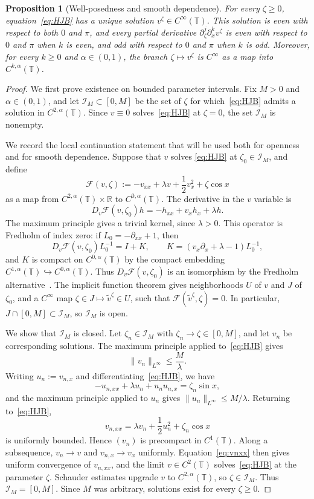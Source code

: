 \documentclass{amsart}
\newtheorem{proposition}[theorem]{Proposition}
\newcommand{\T}{\mathbb T}
\begin{document}
\begin{proposition}[Well-posedness and smooth dependence]\label{prop:smooth-zeta}
For every $\zeta\geq 0$, equation~\eqref{eq:HJB} has a unique solution
$v^\zeta\in C^\infty(\T)$. This solution is even with respect to both
$0$ and $\pi$, and every partial derivative $\partial_\zeta^j\partial_x^k v^\zeta$ is
even with respect to $0$ and $\pi$ when $k$ is even, and odd with respect to $0$ and $\pi$ when $k$
is odd. Moreover, for every $k\geq 0$ and $\alpha\in(0,1)$, the branch
$\zeta\mapsto v^\zeta$ is $C^\infty$ as a map into
$C^{k,\alpha}(\T)$.
\end{proposition}
\begin{proof}
We first prove existence on bounded parameter intervals. Fix
$M>0$ and $\alpha\in(0,1)$, and let $\mathcal I_M\subset[0,M]$ be the set
of $\zeta$ for which~\eqref{eq:HJB} admits a solution in
$C^{2,\alpha}(\T)$. Since $v\equiv0$ solves~\eqref{eq:HJB} at
$\zeta=0$, the set $\mathcal I_M$ is nonempty.

We record the local continuation statement that will be used both for
openness and for smooth dependence. Suppose that $v$ solves
\eqref{eq:HJB} at $\zeta_0\in\mathcal I_M$, and define
\[
\mathcal F(v,\zeta):=-v_{xx}+\lambda v+\frac12 v_x^2+\zeta\cos x
\]
as a map from
$C^{2,\alpha}(\T)\times\mathbb R$ to
$C^{0,\alpha}(\T)$. The derivative in the $v$ variable is
\[
D_v\mathcal F(v,\zeta_0)h=-h_{xx}+v_xh_x+\lambda h.
\]
The maximum principle gives a trivial kernel, since $\lambda>0$. This
operator is Fredholm of index zero: if $L_0=-\partial_{xx}+1$, then
\[
D_v\mathcal F(v,\zeta_0)L_0^{-1}=I+K,\qquad
K=(v_x\partial_x+\lambda-1)L_0^{-1},
\]
and $K$ is compact on $C^{0,\alpha}(\T)$ by the compact
embedding $C^{1,\alpha}(\T)\hookrightarrow
C^{0,\alpha}(\T)$. Thus $D_v\mathcal F(v,\zeta_0)$ is an
isomorphism by the Fredholm alternative~\cite[Thm.~5.3]{GT}. The
implicit function theorem gives neighborhoods $U$ of $v$ and $J$ of
$\zeta_0$, and a $C^\infty$ map
$\zeta\in J\mapsto \tilde v^\zeta\in U$, such that
$\mathcal F(\tilde v^\zeta,\zeta)=0$. In particular,
$J\cap[0,M]\subset\mathcal I_M$, so $\mathcal I_M$ is open.

We show that $\mathcal I_M$ is closed. Let
$\zeta_n\in\mathcal I_M$ with $\zeta_n\to\zeta\in[0,M]$, and let $v_n$
be corresponding solutions. The maximum principle applied to~\eqref{eq:HJB} gives
\[
\|v_n\|_{L^\infty}\leq \frac M\lambda .
\]
Writing $u_n:=v_{n,x}$ and differentiating~\eqref{eq:HJB}, we have
\[
-u_{n,xx}+\lambda u_n+u_nu_{n,x}=\zeta_n\sin x,
\]
and the maximum principle applied to $u_n$ gives
$\|u_n\|_{L^\infty}\leq M/\lambda$. Returning to~\eqref{eq:HJB},
\begin{equation}\label{eq:vnxx}
v_{n,xx}=\lambda v_n+\frac12 u_n^2+\zeta_n\cos x
\end{equation}
is uniformly bounded. Hence $(v_n)$ is precompact in $C^1(\T)$. Along
a subsequence, $v_n\to v$ and $v_{n,x}\to v_x$ uniformly. Equation~\eqref{eq:vnxx}
then gives uniform convergence of $v_{n,xx}$, and
the limit $v\in C^2(\T)$ solves~\eqref{eq:HJB} at the parameter
$\zeta$. Schauder estimates upgrade $v$ to $C^{2,\alpha}(\T)$,
so $\zeta\in\mathcal I_M$. Thus
$\mathcal I_M=[0,M]$. Since $M$ was arbitrary, solutions exist for every
$\zeta\geq0$.


\end{proof}
\end{document}
